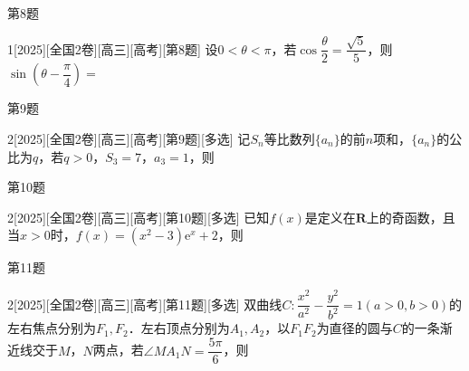 \begin{frame}[allowframebreaks]{第8题}
\begin{example}{1}[2025][全国2卷][高三][高考][第8题]
设$0<\theta<\pi$，若$\cos\dfrac{\theta}{2}=\dfrac{\sqrt{5}}{5}$，则$\sin\left(\theta-\dfrac{\pi}{4}\right)=$\blankbox
\begin{choices}
\end{choices}
\end{example}
\end{frame}
\begin{frame}[allowframebreaks]{第9题}
\begin{example}{2}[2025][全国2卷][高三][高考][第9题][多选]
记$S_n$等比数列$\{a_n\}$的前$n$项和，$\{a_n\}$的公比为$q$，若$q>0$，$S_3=7$，$a_3=1$，则\blankbox
\begin{choices}
\end{choices}
\end{example}
\end{frame}
\begin{frame}[allowframebreaks]{第10题}
\begin{example}{2}[2025][全国2卷][高三][高考][第10题][多选]
已知$f(x)$是定义在$\mathbf{R}$上的奇函数，且当$x>0$时，$f(x)=(x^2-3)\text{e}^x+2$，则\blankbox
\begin{choices}
\end{choices}
\end{example}
\end{frame}
\begin{frame}[allowframebreaks]{第11题}
\begin{example}{2}[2025][全国2卷][高三][高考][第11题][多选]
双曲线$C:\dfrac{x^2}{a^2}-\dfrac{y^2}{b^2}=1(a>0,b>0)$的左右焦点分别为$F_1,F_2$．左右顶点分别为$A_1,A_2$，以$F_1F_2$为直径的圆与$C$的一条渐近线交于$M$，$N$两点，若$\angle MA_1N=\dfrac{5\pi}{6}$，则\blankbox
\begin{choices}
\end{choices}
\end{example}
\end{frame}
